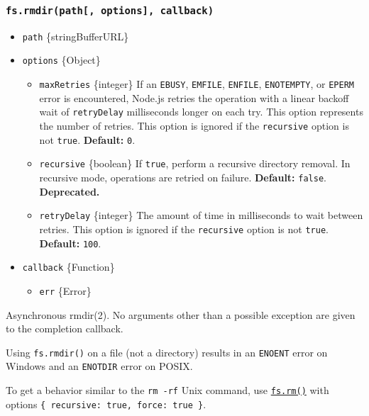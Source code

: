 \subsubsection{\texorpdfstring{\texttt{fs.rmdir(path{[},\ options{]},\ callback)}}{fs.rmdir(path{[}, options{]}, callback)}}\label{fs.rmdirpath-options-callback}

\begin{itemize}
\tightlist
\item
  \texttt{path} \{string\textbar Buffer\textbar URL\}
\item
  \texttt{options} \{Object\}

  \begin{itemize}
  \tightlist
  \item
    \texttt{maxRetries} \{integer\} If an \texttt{EBUSY},
    \texttt{EMFILE}, \texttt{ENFILE}, \texttt{ENOTEMPTY}, or
    \texttt{EPERM} error is encountered, Node.js retries the operation
    with a linear backoff wait of \texttt{retryDelay} milliseconds
    longer on each try. This option represents the number of retries.
    This option is ignored if the \texttt{recursive} option is not
    \texttt{true}. \textbf{Default:} \texttt{0}.
  \item
    \texttt{recursive} \{boolean\} If \texttt{true}, perform a recursive
    directory removal. In recursive mode, operations are retried on
    failure. \textbf{Default:} \texttt{false}. \textbf{Deprecated.}
  \item
    \texttt{retryDelay} \{integer\} The amount of time in milliseconds
    to wait between retries. This option is ignored if the
    \texttt{recursive} option is not \texttt{true}. \textbf{Default:}
    \texttt{100}.
  \end{itemize}
\item
  \texttt{callback} \{Function\}

  \begin{itemize}
  \tightlist
  \item
    \texttt{err} \{Error\}
  \end{itemize}
\end{itemize}

Asynchronous rmdir(2). No arguments other than a possible exception are
given to the completion callback.

Using \texttt{fs.rmdir()} on a file (not a directory) results in an
\texttt{ENOENT} error on Windows and an \texttt{ENOTDIR} error on POSIX.

To get a behavior similar to the \texttt{rm\ -rf} Unix command, use
\hyperref[fsrmpath-options-callback]{\texttt{fs.rm()}} with options
\texttt{\{\ recursive:\ true,\ force:\ true\ \}}.

